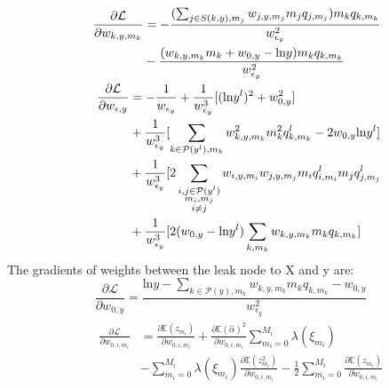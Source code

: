 \documentclass[review]{elsarticle}
\begin{document}
\begin{eqnarray*}
&& 
\begin{aligned}
\frac{\partial \mathcal{L}}{\partial w_{k,y,m_{k}}} & = 
-\frac{(\sum_{j \in S(k,y), m_{j}}w_{j, y, m_{j}}m_{j}q_{j, m_{j}})m_{k}q_{k, m_{k}}}{w_{\epsilon_{y}}^{2}}\\
& -\frac{(w_{k,y,m_{k}}m_{k} + w_{0,y} - \text{ln}y)m_{k}q_{k, m_{k}}}{w_{\epsilon_{y}}^{2}}
\end{aligned}
\\
&& 
\begin{aligned}
    \frac{\partial \mathcal{L}}{\partial w_{\epsilon,y}} & = - \frac{1}{w_{\epsilon_{y}}} + 
    \frac{1}{w_{\epsilon_{y}}^{3}}[(\text{ln}y^l)^2 + w_{0,y}^2] \\
    &+ \frac{1}{w_{\epsilon_{y}}^{3}}[\sum_{k \in \mathcal{P}(y^l), m_{k}}w_{k,y,m_{k}}^{2} m_{k}^2 q^l_{k,m_{k}} - 2w_{0,y}\text{ln}y^l] \\
    & + \frac{1}{w_{\epsilon_{y}}^{3}}[2\sum_{\begin{subarray}{c} i,j \in \mathcal{P}(y^l)\\ m_{i}, m_{j}\\ i \neq j\end{subarray}}w_{i,y,m_{i}}w_{j,y,m_{j}}m_{i}q^l_{i,m_{i}}m_{j} q^l_{j,m_{j}} \\
    &+ \frac{1}{w_{\epsilon_{y}}^{3}}[2(w_{0,y}-\text{ln}y^l)\sum_{k, m_{k}}w_{k,y,m_{k}}m_{k}q_{k,m_{k}}]
\end{aligned}
\end{eqnarray*}
The gradients of weights between the leak node to X and y are:
\begin{equation*}
    \frac{\partial \mathcal{L}}{\partial w_{0,y}} = \frac{\text{ln}y - \sum_{k \in \mathcal{P}(y), m_{k}}w_{k,y,m_{k}}m_{k}q_{k, m_{k}} - w_{0,y}}{w_{\epsilon_{y}}^{2}}
\end{equation*}
\begin{eqnarray*}
&&
\begin{aligned}
\frac{\partial \mathcal{L}}{\partial w_{0, i, m_{i}}} & = \frac{\partial \mathbb{E}(z_{m_{i}})}{\partial w_{0, i, m_{i}}} + \frac{\partial \mathbb{E}(\hat{\alpha})^{2}}{\partial w_{0, i, m_{i}}}\sum_{m_{i}=0}^{M_{i}}\lambda(\xi_{m_{i}}) \\
& - \sum_{m_{i}=0}^{M_{i}}\lambda(\xi_
{m_{i}})\frac{\partial \mathbb{E}(z_{m_{i}}^{2})}{\partial w_{0, i, m_{i}}} 
- \frac{1}{2}\sum_{m_{i}=0}^{M_{i}}\frac{\partial \mathbb{E}(z_{m_{i}})}{\partial w_{0, i, m_{i}}}
\end{aligned}
\end{eqnarray*}
\end{document}
